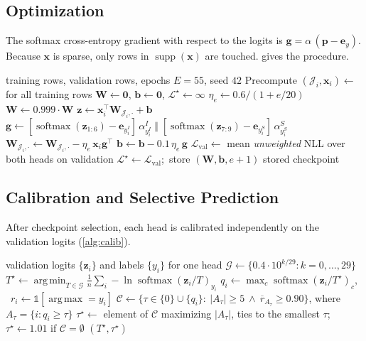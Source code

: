 \documentclass[11pt,a4paper]{article}
\theoremstyle{remark}
\newcommand{\x}{\bm{x}}
\newcommand{\W}{\bm{W}}
\newcommand{\bb}{\bm{b}}
\newcommand{\z}{\bm{z}}
\newcommand{\p}{\bm{p}}
\DeclareMathOperator*{\argmin}{arg\,min}
\DeclareMathOperator*{\argmax}{arg\,max}
\DeclareMathOperator{\softmax}{softmax}
\begin{document}
\subsection{Optimization}
The softmax cross-entropy gradient with respect to the logits is
$\bm{g}=\alpha\,(\p-\bm{e}_y)$. Because $\x$ is sparse, only rows in
$\operatorname{supp}(\x)$ are touched.  gives the procedure.

\begin{algorithm}[h]
\caption{Class-balanced sparse SGD with validation checkpointing}
\label{alg:train}
\small
\begin{algorithmic}[1]
\Require training rows, validation rows, epochs $E=55$, seed $42$
\State Precompute $(\mathcal{J}_i,\x_i)\gets$  for all training rows
\State $\W\gets\bm 0$, $\bb\gets\bm 0$, $\mathcal{L}^\star\gets\infty$
  \State $\eta_e\gets 0.6/(1+e/20)$
  \State $\W\gets 0.999\cdot\W$ 
    \State $\z\gets\x_i^{\!\top}\W_{\mathcal{J}_i,\cdot}+\bb$
    \State $\bm g\gets[\softmax(\z_{1:6})-\bm e_{y^I_i}]\,\alpha^I_{y^I_i}\;\Vert\;[\softmax(\z_{7:9})-\bm e_{y^S_i}]\,\alpha^S_{y^S_i}$
    \State $\W_{\mathcal{J}_i,\cdot}\gets\W_{\mathcal{J}_i,\cdot}-\eta_e\,\x_i\bm g^{\!\top}$
    \State $\bb\gets\bb-0.1\,\eta_e\,\bm g$
  \EndFor
  \State $\mathcal{L}_{\text{val}}\gets$ mean \emph{unweighted} NLL over both heads on validation
   \State $\mathcal{L}^\star\gets\mathcal{L}_{\text{val}}$;\ store $(\W,\bb,e+1)$ \EndIf
\EndFor
\State \Return stored checkpoint
\end{algorithmic}
\end{algorithm}

\subsection{Calibration and Selective Prediction}
\label{sec:calibration}

After checkpoint selection, each head is calibrated independently on the
validation logits (\cref{alg:calib}).

\begin{algorithm}[h]
\caption{Per-head temperature scaling and review-threshold selection}
\label{alg:calib}
\small
\begin{algorithmic}[1]
\Require validation logits $\{\z_i\}$ and labels $\{y_i\}$ for one head
\State $\mathcal{G}\gets\{0.4\cdot 10^{k/29}: k=0,\dots,29\}$ 
\State $T^\star\gets\argmin_{T\in\mathcal{G}}\frac1n\sum_i-\ln\softmax(\z_i/T)_{y_i}$
\State $q_i\gets\max_c\softmax(\z_i/T^\star)_c$, \ $r_i\gets\mathbb 1[\argmax=y_i]$
\State $\mathcal{C}\gets\big\{\tau\in\{0\}\cup\{q_i\}:\ |A_\tau|\ge5\ \wedge\ \overline{r}_{A_\tau}\ge0.90\big\}$, where $A_\tau=\{i:q_i\ge\tau\}$
\State $\tau^\star\gets$ element of $\mathcal{C}$ maximizing $|A_\tau|$, ties to the smallest $\tau$; \ $\tau^\star\gets1.01$ if $\mathcal{C}=\emptyset$
\State \Return $(T^\star,\tau^\star)$
\end{algorithmic}
\end{algorithm}
\end{document}
